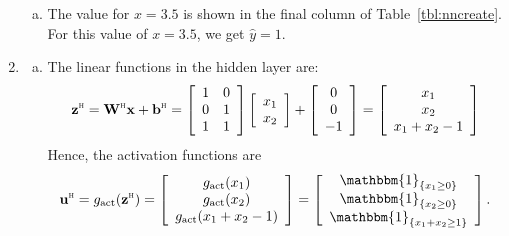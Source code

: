 \documentclass[11pt]{article}
\newcommand{\bbf}{\mathbf{b}}
\newcommand{\ubf}{\mathbf{u}}
\newcommand{\xbf}{\mathbf{x}}
\newcommand{\zbf}{\mathbf{z}}
\newcommand{\Wbf}{\mathbf{W}}
\newcommand{\indic}[1]{\mathbbm{1}_{ \{ {#1} \} }}
\def\hid{\textsc{\tiny H}}
\begin{document}
\begin{enumerate}
\begin{enumerate}[(a)]
\item The value for $x=3.5$ is shown in the final column of
Table~\ref{tbl:nncreate}.  For this value of $x=3.5$, we get $\hat{y}=1$.

\end{enumerate}

\item  \label{prob:nntwo}

\begin{enumerate}[(a)]
\item
The linear functions in the hidden layer are:
\[
    \zbf^\hid = \Wbf^\hid\xbf + \bbf^\hid =
    \left[ \begin{array}{cc} 1 & 0 \\ 0 & 1 \\ 1 & 1 \end{array} \right]
    \left[ \begin{array}{c} x_1 \\ x_2 \end{array} \right] +
    \left[ \begin{array}{c} 0 \\ 0 \\ -1  \end{array} \right]
    =  \left[ \begin{array}{c} x_1 \\ x_2 \\ x_1 + x_2 -1 \end{array} \right]
\]
Hence, the activation functions are
\[
    \ubf^\hid = g_{\rm act}(\zbf^\hid) =
     \left[ \begin{array}{c} g_{\rm act}(x_1) \\ g_{\rm act}(x_2)
        \\ g_{\rm act}(x_1+x_2-1) \end{array} \right]
     =
     \left[ \begin{array}{c} \indic{x_1 \geq 0} \\ \indic{x_2 \geq 0}
     \\ \indic{x_1+x_2 \geq 1} \end{array} \right].
\]


\end{enumerate}
\end{enumerate}
\end{document}
